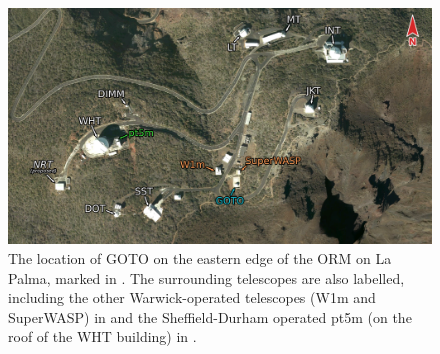 \begin{colsection}
\begin{colsection}
\begin{figure}[p]
    \begin{center}
        \includegraphics[width=\linewidth]{images/orm_east_labelled.png}
    \end{center}
    \caption[The location of GOTO on La Palma]{
        The location of GOTO on the eastern edge of the ORM on La Palma, marked in . The surrounding telescopes are also labelled, including the other Warwick-operated telescopes (W1m and SuperWASP) in  and the Sheffield-Durham operated pt5m (on the roof of the WHT building) in .
    }\label{fig:orm_east}
\end{figure}

\clearpage

\end{colsection}


\end{colsection}

